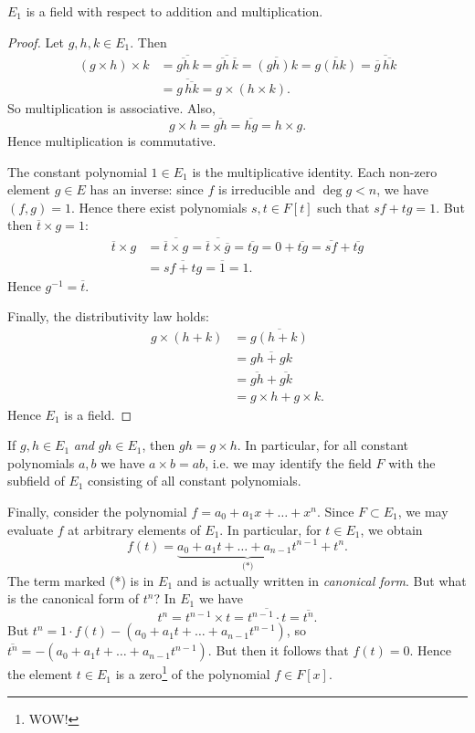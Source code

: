 \begin{proposition}
	$E_1$ is a field with respect to addition and multiplication.
	\begin{proof}
		Let $g, h, k \in E_1$. Then
		\begin{align*}
			(g \times h) \times k &= \overline{\overline{gh}\,k} = \overline{\overline{gh}\,\overline{k}} = \overline{(gh)k} = \overline{g(hk)} = \overline{\overline{g}\,\overline{hk}} \\
					&= \overline{g\,\overline{hk}} = g \times (h \times k).
		\end{align*}
		So multiplication is associative. Also,
		\[
			g \times h = \overline{gh} = \overline{hg} = h \times g.
		\]
		Hence multiplication is commutative.
		
		The constant polynomial $1 \in E_1$ is the multiplicative identity. Each non-zero element $g \in E$ has an inverse: since $f$ is irreducible and $\deg{g} < n$, we have $(f, g) = 1$. Hence there exist polynomials $s, t \in F[t]$ such that $sf + tg = 1$. But then $\overline{t} \times g = 1$:
		\begin{align*}
			\overline{t} \times g &= \overline{\overline{t} \times g} = \overline{\overline{t} \times \overline{g}} = \overline{tg} = 0 + \overline{tg} = \overline{sf} + \overline{tg} \\
					&= \overline{sf + tg} = \overline{1} = 1.
		\end{align*}
		Hence $g^{-1} = \overline{t}$.
		
		Finally, the distributivity law holds:
		\begin{align*}
			g \times (h + k) &= \overline{g(h + k)} \\
					&= \overline{gh + gk} \\
					&= \overline{gh} + \overline{gk} \\
					&= g \times h + g \times k.
		\end{align*}
		Hence $E_1$ is a field.
	\end{proof}
\end{proposition}

\begin{note}
	If $g, h \in E_1$ \emph{and} $gh \in E_1$, then $gh = g \times h$. In particular, for all constant polynomials $a, b$ we have $a \times b = ab$, i.e. we may identify the field $F$ with the subfield of $E_1$ consisting of all constant polynomials.
\end{note}

Finally, consider the polynomial $f = a_0 + a_1 x + \dots + x^n$. Since $F \subset E_1$, we may evaluate $f$ at arbitrary elements of $E_1$. In particular, for $t \in E_1$, we obtain
\[
	f(t) = \underbrace{a_0 + a_1 t + \dots + a_{n - 1} t^{n - 1}}_{\text{(*)}} + t^n.
\]
The term marked (*) is in $E_1$ and is actually written in \emph{canonical form}. But what is the canonical form of $t^n$? In $E_1$ we have
\[
	t^n = t^{n - 1} \times t = \overline{t^{n - 1} \cdot t} = \overline{t^n}.
\]
But $t^n = 1 \cdot f(t) - (a_0 + a_1 t + \dots + a_{n - 1} t^{n - 1})$, so $\overline{t^n} = -(a_0 + a_1 t + \dots + a_{n - 1} t^{n - 1})$. But then it follows that $f(t) = 0$. Hence the element $t \in E_1$ is a zero\footnote{WOW!} of the polynomial $f \in F[x]$.

